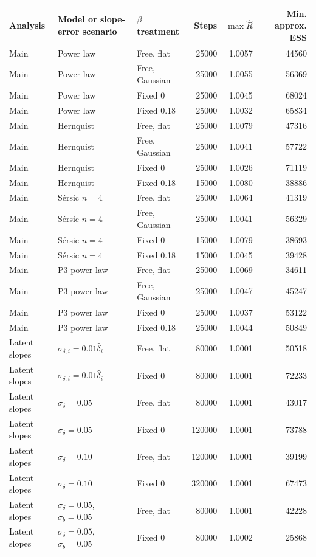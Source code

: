 \begin{tabular}{lllrrr}
\toprule
Analysis & Model or slope-error scenario & $\beta$ treatment & Steps & $\max\widehat R$ & Min. approx. ESS \\
\midrule
Main & Power law & Free, flat & 25000 & 1.0057 & 44560 \\
Main & Power law & Free, Gaussian & 25000 & 1.0055 & 56369 \\
Main & Power law & Fixed 0 & 25000 & 1.0045 & 68024 \\
Main & Power law & Fixed 0.18 & 25000 & 1.0032 & 65834 \\
\addlinespace[3pt]
Main & Hernquist & Free, flat & 25000 & 1.0079 & 47316 \\
Main & Hernquist & Free, Gaussian & 25000 & 1.0041 & 57722 \\
Main & Hernquist & Fixed 0 & 25000 & 1.0026 & 71119 \\
Main & Hernquist & Fixed 0.18 & 15000 & 1.0080 & 38886 \\
\addlinespace[3pt]
Main & S\'ersic $n=4$ & Free, flat & 25000 & 1.0064 & 41319 \\
Main & S\'ersic $n=4$ & Free, Gaussian & 25000 & 1.0041 & 56329 \\
Main & S\'ersic $n=4$ & Fixed 0 & 15000 & 1.0079 & 38693 \\
Main & S\'ersic $n=4$ & Fixed 0.18 & 15000 & 1.0045 & 39428 \\
\addlinespace[3pt]
Main & P3 power law & Free, flat & 25000 & 1.0069 & 34611 \\
Main & P3 power law & Free, Gaussian & 25000 & 1.0047 & 45247 \\
Main & P3 power law & Fixed 0 & 25000 & 1.0037 & 53122 \\
Main & P3 power law & Fixed 0.18 & 25000 & 1.0044 & 50849 \\
\addlinespace[3pt]
Latent slopes & $\sigma_{\delta,i}=0.01\widehat\delta_i$ & Free, flat & 80000 & 1.0001 & 50518 \\
Latent slopes & $\sigma_{\delta,i}=0.01\widehat\delta_i$ & Fixed 0 & 80000 & 1.0001 & 72233 \\
\addlinespace[3pt]
Latent slopes & $\sigma_\delta=0.05$ & Free, flat & 80000 & 1.0001 & 43017 \\
Latent slopes & $\sigma_\delta=0.05$ & Fixed 0 & 120000 & 1.0001 & 73788 \\
\addlinespace[3pt]
Latent slopes & $\sigma_\delta=0.10$ & Free, flat & 120000 & 1.0001 & 39199 \\
Latent slopes & $\sigma_\delta=0.10$ & Fixed 0 & 320000 & 1.0001 & 67473 \\
\addlinespace[3pt]
Latent slopes & $\sigma_\delta=0.05$, $\sigma_b=0.05$ & Free, flat & 80000 & 1.0001 & 42228 \\
Latent slopes & $\sigma_\delta=0.05$, $\sigma_b=0.05$ & Fixed 0 & 80000 & 1.0002 & 25868 \\
\bottomrule
\end{tabular}
